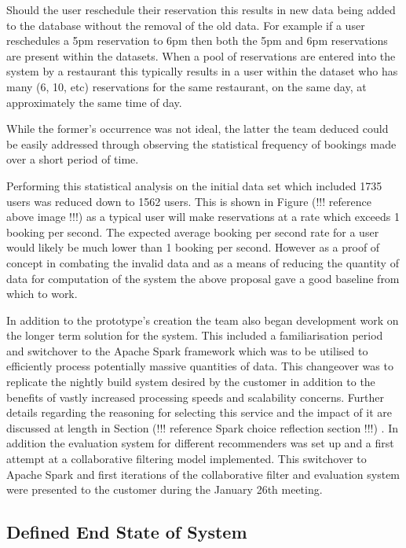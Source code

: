 \documentclass{l3proj}
\begin{document}
Should the user reschedule their reservation this results in new data being added to the database without the removal of the old data. For example if a user reschedules a 5pm reservation to 6pm then both the 5pm and 6pm reservations are present within the datasets.
When a pool of reservations are entered into the system by a restaurant this typically results in a user within the dataset who has many (6, 10, etc) reservations for the same restaurant, on the same day, at approximately the same time of day.

While the former’s occurrence was not ideal, the latter the team deduced could be easily addressed through observing the statistical frequency of bookings made over a short period of time.

Performing this statistical analysis on the initial data set which included 1735 users was reduced down to 1562 users. This is shown in Figure (!!! reference above image !!!)  as a typical user will make reservations at a rate which exceeds 1 booking per second. The expected average booking per second rate for a user would likely be much lower than 1 booking per second. However as a proof of concept in combating the invalid data and as a means of reducing the quantity of data for computation of the system the above proposal gave a good baseline from which to work.

In addition to the prototype’s creation the team also began development work on the longer term solution for the system. This included a familiarisation period and switchover to the Apache Spark framework which was to be utilised to efficiently process potentially massive quantities of data. This changeover was to replicate the nightly build system desired by the customer in addition to the benefits of vastly increased processing speeds and scalability concerns. Further details regarding the reasoning for selecting this service and the impact of it are discussed at length in Section (!!! reference Spark choice reflection section !!!) . In addition the evaluation system for different recommenders was set up and a first attempt at a collaborative filtering model implemented. This switchover to Apache Spark and first iterations of the collaborative filter and evaluation system were presented to the customer during the January 26th meeting.


\subsection{Defined End State of System}
\label{sec:jandefinedstate}
\end{document}
